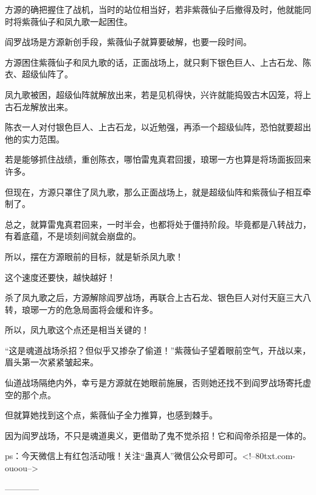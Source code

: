 \begin{this_body}
方源的确把握住了战机，当时的站位相当好，若非紫薇仙子后撤得及时，他就能同时将紫薇仙子和凤九歌一起困住。

阎罗战场是方源新创手段，紫薇仙子就算要破解，也要一段时间。

方源困住紫薇仙子和凤九歌的话，正面战场上，就只剩下银色巨人、上古石龙、陈衣、超级仙阵了。

凤九歌被困，超级仙阵就解放出来，若是见机得快，兴许就能捣毁古木囚笼，将上古石龙解放出来。

陈衣一人对付银色巨人、上古石龙，以近勉强，再添一个超级仙阵，恐怕就要超出他的实力范围。

若是能够抓住战绩，重创陈衣，哪怕雷鬼真君回援，琅琊一方也算是将场面扳回来许多。

但现在，方源只罩住了凤九歌，那么正面战场上，就是超级仙阵和紫薇仙子相互牵制了。

总之，就算雷鬼真君回来，一时半会，也都将处于僵持阶段。毕竟都是八转战力，有着底蕴，不是顷刻间就会崩盘的。

所以，摆在方源眼前的目标，就是斩杀凤九歌！

这个速度还要快，越快越好！

杀了凤九歌之后，方源解除阎罗战场，再联合上古石龙、银色巨人对付天庭三大八转，琅琊一方的危急局面将会缓和许多。

所以，凤九歌这个点还是相当关键的！

“这是魂道战场杀招？但似乎又掺杂了偷道！”紫薇仙子望着眼前空气，开战以来，眉头第一次紧紧皱起来。

仙道战场隔绝内外，幸亏是方源就在她眼前施展，否则她还找不到阎罗战场寄托虚空的那个点。

但就算她找到这个点，紫薇仙子全力推算，也感到棘手。

因为阎罗战场，不只是魂道奥义，更借助了鬼不觉杀招！它和阎帝杀招是一体的。

ps：今天微信上有红包活动哦！关注“蛊真人”微信公众号即可。<!--80txt.com-ouoou-->

------------

\end{this_body}

